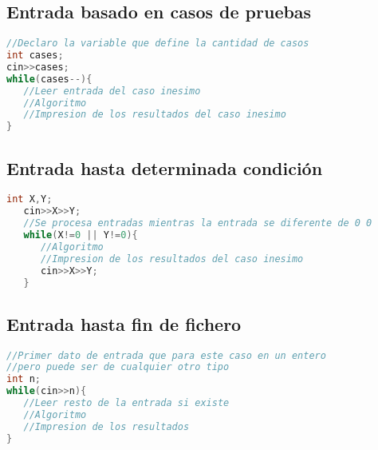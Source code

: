 \subsection{Entrada basado en casos de pruebas}
\begin{lstlisting}[language=C++]
//Declaro la variable que define la cantidad de casos
int cases;
cin>>cases;
while(cases--){
   //Leer entrada del caso inesimo
   //Algoritmo
   //Impresion de los resultados del caso inesimo
}
\end{lstlisting}

\subsection{Entrada hasta determinada condición}

\begin{lstlisting}[language=C++]
   int X,Y;
   cin>>X>>Y;
   //Se procesa entradas mientras la entrada se diferente de 0 0
   while(X!=0 || Y!=0){
      //Algoritmo
      //Impresion de los resultados del caso inesimo
      cin>>X>>Y;
   }
\end{lstlisting}


\subsection{Entrada hasta fin de fichero}

\begin{lstlisting}[language=C++]
//Primer dato de entrada que para este caso en un entero
//pero puede ser de cualquier otro tipo
int n;
while(cin>>n){
   //Leer resto de la entrada si existe
   //Algoritmo
   //Impresion de los resultados
}
\end{lstlisting}

